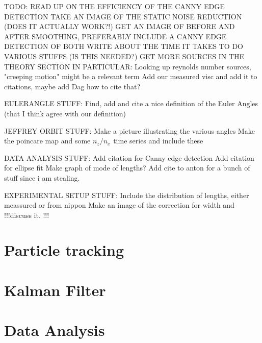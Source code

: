 \documentclass[]{report}
\begin{document}

TODO:
READ UP ON THE EFFICIENCY OF THE CANNY EDGE DETECTION
TAKE AN IMAGE OF THE STATIC NOISE REDUCTION (DOES IT ACTUALLY WORK?!)
GET AN IMAGE OF BEFORE AND AFTER SMOOTHING, PREFERABLY INCLUDE A CANNY EDGE DETECTION OF BOTH 
WRITE ABOUT THE TIME IT TAKES TO DO VARIOUS STUFFS (IS THIS NEEDED?)
GET MORE SOURCES IN THE THEORY SECTION
IN PARTICULAR:
Looking up reynolds number sources, "creeping motion" might be a relevant term
Add our measured visc and add it to citations, maybe add Dag how to cite that?

EULERANGLE STUFF:
Find, add and cite a nice definition of the Euler Angles (that I think agree with our definition)

JEFFREY ORBIT STUFF:
Make a picture illustrating the various angles
Make the poincare map and some $n_z/n_x$ time series and include these

DATA ANALYSIS STUFF:
Add citation for Canny edge detection
Add citation for ellipse fit
Make graph of mode of lengths?
Add cite to anton for a bunch of stuff since i am stealing. 


EXPERIMENTAL SETUP STUFF:
Include the distribution of lengths, either meassured or from nippon
Make an image of the correction for width and !!!discuss it. !!!



\section{Particle tracking}


\section{Kalman Filter}


\section{Data Analysis}

\end{document}

